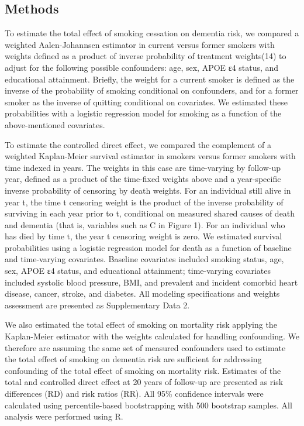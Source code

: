 \documentclass[
]{book}
\begin{document}
\hypertarget{methods-4}{%
\subsection{Methods}\label{methods-4}}

To estimate the total effect of smoking cessation on dementia risk, we compared a weighted Aalen-Johannsen estimator in current versus former smokers with weights defined as a product of inverse probability of treatment weights(14) to adjust for the following possible confounders: age, sex, APOE ε4 status, and educational attainment. Briefly, the weight for a current smoker is defined as the inverse of the probability of smoking conditional on confounders, and for a former smoker as the inverse of quitting conditional on covariates. We estimated these probabilities with a logistic regression model for smoking as a function of the above-mentioned covariates.

To estimate the controlled direct effect, we compared the complement of a weighted Kaplan-Meier survival estimator in smokers versus former smokers with time indexed in years. The weights in this case are time-varying by follow-up year, defined as a product of the time-fixed weights above and a year-specific inverse probability of censoring by death weights. For an individual still alive in year t, the time t censoring weight is the product of the inverse probability of surviving in each year prior to t, conditional on measured shared causes of death and dementia (that is, variables such as C in Figure 1). For an individual who has died by time t, the year t censoring weight is zero. We estimated survival probabilities using a logistic regression model for death as a function of baseline and time-varying covariates. Baseline covariates included smoking status, age, sex, APOE ε4 status, and educational attainment; time-varying covariates included systolic blood pressure, BMI, and prevalent and incident comorbid heart disease, cancer, stroke, and diabetes. All modeling specifications and weights assessment are presented as Supplementary Data 2.

We also estimated the total effect of smoking on mortality risk applying the Kaplan-Meier estimator with the weights calculated for handling confounding. We therefore are assuming the same set of measured confounders used to estimate the total effect of smoking on dementia risk are sufficient for addressing confounding of the total effect of smoking on mortality risk. Estimates of the total and controlled direct effect at 20 years of follow-up are presented as risk differences (RD) and risk ratios (RR). All 95\% confidence intervals were calculated using percentile-based bootstrapping with 500 bootstrap samples. All analysis were performed using R.
\end{document}
